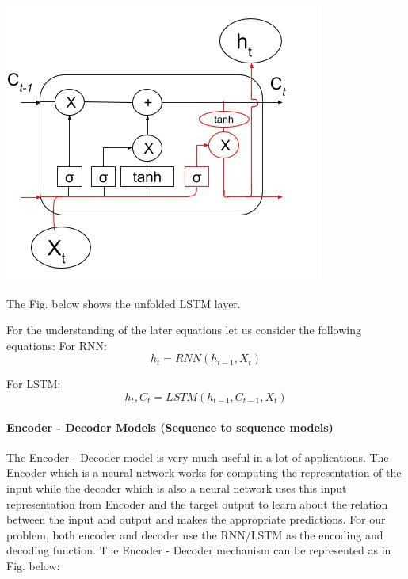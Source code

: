 				\begin{center}
				\includegraphics[width=\linewidth]{figures/output-gate.jpg}	
				\label{fig: Output Gate}
				\end{center}

The Fig. below shows the unfolded LSTM layer.

For the understanding of the later equations let us consider the following equations:
For RNN: \begin{equation} h_{t} = RNN(h_{t-1}, X_{t}) \end{equation}

For LSTM: \begin{equation} h_{t}, C_{t} = LSTM(h_{t-1}, C_{t-1}, X_{t}) \end{equation} 

\paragraph{Encoder - Decoder Models (Sequence to sequence models)}

The Encoder - Decoder model \cite{12} is very much useful in a lot of applications. The Encoder which is a neural network works for computing the representation of the input while the decoder which is also a neural network uses this input representation from Encoder and the target output to learn about the relation between the input and output and makes the appropriate predictions. For our problem, both encoder and decoder use the RNN/LSTM as the encoding and decoding function. The Encoder - Decoder mechanism can be represented as in Fig. below:

